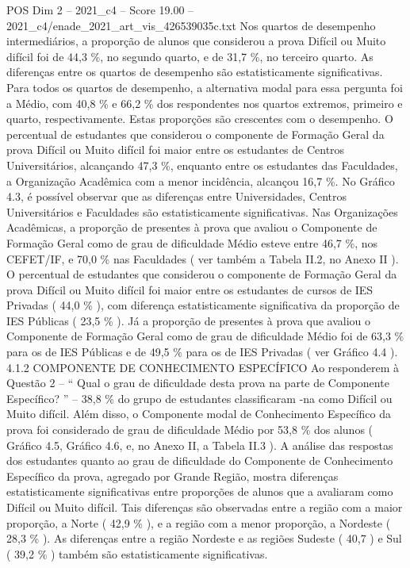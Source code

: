 \begin{textsample}{POS Dim 2 – 2021\_c4 – Score 19.00 – 2021\_c4/enade\_2021\_art\_vis\_426539035c.txt}
Nos quartos de desempenho intermediários, a proporção de alunos que considerou a prova Difícil ou Muito difícil foi de 44,3 \%, no segundo quarto, e de 31,7 \%, no terceiro quarto.
As diferenças entre os quartos de desempenho são estatisticamente significativas.
Para todos os quartos de desempenho, a alternativa modal para essa pergunta foi a Médio, com 40,8 \% e 66,2 \% dos respondentes nos quartos extremos, primeiro e quarto, respectivamente.
Estas proporções são crescentes com o desempenho.
O percentual de estudantes que considerou o componente de Formação Geral da prova Difícil ou Muito difícil foi maior entre os estudantes de Centros Universitários, alcançando 47,3 \%, enquanto entre os estudantes das Faculdades, a Organização Acadêmica com a menor incidência, alcançou 16,7 \%.
No Gráfico 4.3, é possível observar que as diferenças entre Universidades, Centros Universitários e Faculdades são estatisticamente significativas.
Nas Organizações Acadêmicas, a proporção de presentes à prova que avaliou o Componente de Formação Geral como de grau de dificuldade Médio esteve entre 46,7 \%, nos CEFET/IF, e 70,0 \% nas Faculdades ( ver também a Tabela II.2, no Anexo II ).
O percentual de estudantes que considerou o componente de Formação Geral da prova Difícil ou Muito difícil foi maior entre os estudantes de cursos de IES Privadas ( 44,0 \% ), com diferença estatisticamente significativa da proporção de IES Públicas ( 23,5 \% ).
Já a proporção de presentes à prova que avaliou o Componente de Formação Geral como de grau de dificuldade Médio foi de 63,3 \% para os de IES Públicas e de 49,5 \% para os de IES Privadas ( ver Gráfico 4.4 ). 4.1.2 COMPONENTE DE CONHECIMENTO ESPECÍFICO Ao responderem à Questão 2 – “ Qual o grau de dificuldade desta prova na parte de Componente Específico? ” – 38,8 \% do grupo de estudantes classificaram -na como Difícil ou Muito difícil.
Além disso, o Componente modal de Conhecimento Específico da prova foi considerado de grau de dificuldade Médio por 53,8 \% dos alunos ( Gráfico 4.5, Gráfico 4.6, e, no Anexo II, a Tabela II.3 ).
A análise das respostas dos estudantes quanto ao grau de dificuldade do Componente de Conhecimento Específico da prova, agregado por Grande Região, mostra diferenças estatisticamente significativas entre proporções de alunos que a avaliaram como Difícil ou Muito difícil.
Tais diferenças são observadas entre a região com a maior proporção, a Norte ( 42,9 \% ), e a região com a menor proporção, a Nordeste ( 28,3 \% ).
As diferenças entre a região Nordeste e as regiões Sudeste ( 40,7 ) e Sul ( 39,2 \% ) também são estatisticamente significativas.

\end{textsample}
